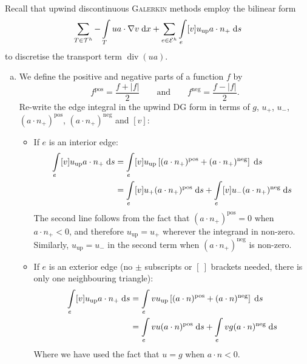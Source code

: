 Recall that upwind discontinuous \textsc{Galerkin} methods employ the bilinear form
\begin{equation*}
\sum_{T\in\mathcal{T}^h} -\int\limits_T ua \cdot \nabla v \;\mathrm{d}x + \sum_{e\in\mathcal{E}^h} \int\limits_e [v] u_{\text{up}} a \cdot n_+ \;\mathrm{d}s
\end{equation*}
to discretise the transport term $\operatorname{div} (ua)$.
\begin{enumerate}[(a)]
\item We define the positive and negative parts of a function $f$ by
\begin{equation*}
f^{\text{pos}} = \frac{f + \lvert f \rvert}{2} \qquad \text{and} \qquad f^{\text{neg}} = \frac{f - \lvert f \rvert}{2}.
\end{equation*}
Re-write the edge integral in the upwind DG form in terms of $g$, $u_+$, $u_-$, $(a\cdot n_+)^{\text{pos}}$, $(a\cdot n_+)^{\text{neg}}$ and $[v]$:
\begin{itemize}
\item If $e$ is an interior edge:
\begin{align*}
\int\limits_e [v] u_{\text{up}} a \cdot n_+ \;\mathrm{d}s
&= \int\limits_e [v] u_{\text{up}} \left[ (a\cdot n_+)^{\text{pos}} + (a\cdot n_+)^{\text{neg}} \right] \;\mathrm{d}s \\
&= \int\limits_e [v] u_+ (a\cdot n_+)^{\text{pos}} \;\mathrm{d}s + \int\limits_e [v] u_- (a\cdot n_+)^{\text{neg}} \;\mathrm{d}s
\end{align*}
The second line follows from the fact that $(a\cdot n_+)^{\text{pos}} = 0$ when $a\cdot n_+ < 0$, and therefore $u_{\text{up}} = u_+$ wherever the integrand in non-zero. Similarly, $u_{\text{up}} = u_-$ in the second term when $(a\cdot n_+)^{\text{neg}}$ is non-zero.
\vfill
\item If $e$ is an exterior edge (no $\pm$ subscripts or $[\:]$ brackets needed, there is only one neighbouring triangle):
\begin{align*}
\int\limits_e [v] u_{\text{up}} a \cdot n_+ \;\mathrm{d}s
&= \int\limits_e v u_{\text{up}} \left[ (a\cdot n)^{\text{pos}} + (a\cdot n)^{\text{neg}} \right] \;\mathrm{d}s \\
&= \int\limits_e v u (a\cdot n)^{\text{pos}} \;\mathrm{d}s + \int\limits_e v g (a\cdot n)^{\text{neg}} \;\mathrm{d}s
\end{align*}
Where we have used the fact that $u=g$ when $a\cdot n < 0$.
\end{itemize}

\newpage


\end{enumerate}
